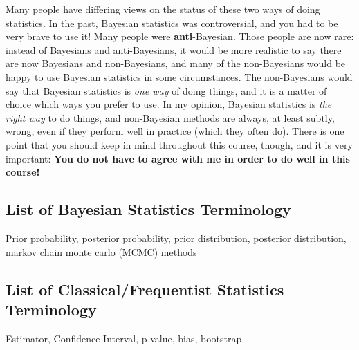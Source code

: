 Many
people have differing views on the status of these two ways of doing statistics.
In the past, Bayesian statistics was controversial, and you had to be very
brave to use it! Many people were {\bf anti}-Bayesian. Those people are now
rare: instead of Bayesians and anti-Bayesians, it would be more realistic to
say there are now Bayesians and non-Bayesians, and many of the non-Bayesians
would be happy to use Bayesian statistics in some circumstances.
The non-Bayesians would say that
Bayesian statistics is {\it one way} of doing things, and it is a matter of
choice which ways you prefer to use. In my opinion, Bayesian
statistics is {\it the right way} to do things, and non-Bayesian methods are
always, at least subtly, wrong, even if they perform well in practice (which
they often do). There is one point that you should keep in mind throughout
this course, though, and it is very important:
{\bf You do not have to agree with me in order to do well in this course!}

\subsection{List of Bayesian Statistics Terminology}
Prior probability, posterior probability, prior distribution, posterior
distribution, markov chain monte carlo (MCMC) methods

\subsection{List of Classical/Frequentist Statistics Terminology}
Estimator, Confidence Interval, p-value, bias, bootstrap.

